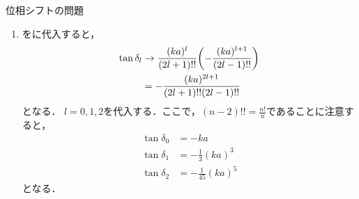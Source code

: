 \documentclass{report}
\begin{document}
\begin{myex}{位相シフトの問題}{}
\begin{enumerate}
\begin{align}
          \e^{2\i \delta_l} h_l^{(1)} (ka) + h_l^{(2)}(ka) = 0 \\
          \e^{2\i \delta_l}\qty(j_l(ka) + \i n_l(ka)) + \qty(j_l(ka) - \i n_l(ka)) = 0 \\
          \qty(\e^{2\i \delta_l} + 1)j_l(ka) + \i\qty(\e^{2\i \delta_l} - 1)n_l(ka) = 0 \\
          2\cos\delta_l j_l(ka) -2 \sin\delta_l n_l(ka) = 0
        \end{align}
        となり，位相シフトとして，
        \begin{align}
          \tan\delta_l = \frac{j_l(ka)}{n_l(ka)}\label{phaseshift}
        \end{align}
        が得られる．
      \item {}をに代入すると，
        \begin{align}
          \tan\delta_l &\to \frac{(ka)^l}{(2l+1)!!} \qty(- \frac{(ka)^{l+1}}{(2l -1)!!}) \\
          &= -\frac{(ka)^{2l+1}}{(2l+1)!!(2l-1)!!} \\
        \end{align}
        となる．
        $l = 0, 1, 2$を代入する．ここで，$(n - 2)!! = \frac{n!}{n}$であることに注意すると，
        \begin{align}
          \tan\delta_0 &= -ka \\
          \tan\delta_1 &= -\frac{1}{3}(ka)^3 \\
          \tan\delta_2 &= -\frac{1}{45}(ka)^5
        \end{align}
        となる．
    \end{enumerate}
  \end{myex}
\end{document}
